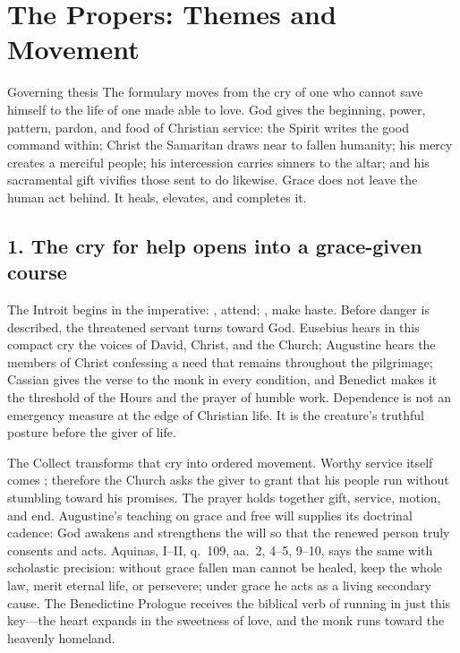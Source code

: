 \section*{The Propers: Themes and Movement}
\label{triptych:brief-synthesis:start}
\begingroup\fontsize{9}{9.8}\selectfont

\begin{studybox}{Governing thesis}
The formulary moves from the cry of one who cannot save himself to the life of
one made able to love. God gives the beginning, power, pattern, pardon, and
food of Christian service: the Spirit writes the good command within; Christ
the Samaritan draws near to fallen humanity; his mercy creates a merciful
people; his intercession carries sinners to the altar; and his sacramental
gift vivifies those sent to do likewise. Grace does not leave the human act
behind. It heals, elevates, and completes it.
\end{studybox}

\subsection*{1. The cry for help opens into a grace-given course }

The Introit begins in the imperative: , attend; ,
make haste. Before danger is described, the threatened servant turns toward
God. Eusebius hears in this compact cry the voices of David, Christ, and the
Church; Augustine hears the members of Christ confessing a need that remains
throughout the pilgrimage; Cassian gives the verse to the monk in every
condition, and Benedict makes it the threshold of the Hours and the prayer of
humble work. Dependence is not an emergency measure at the edge of Christian
life. It is the creature's truthful posture before the giver of life.

The Collect transforms that cry into ordered movement. Worthy service itself
comes ; therefore the Church asks the giver to grant
that his people run without stumbling toward his promises. The prayer holds
together gift, service, motion, and end. Augustine's teaching on grace and free
will supplies its doctrinal cadence: God awakens and strengthens the will so
that the renewed person truly consents and acts. Aquinas,  I--II,
q.~109, aa.~2, 4--5, 9--10, says the same with scholastic precision: without
grace fallen man cannot be healed, keep the whole law, merit eternal life, or
persevere; under grace he acts as a living secondary cause. The Benedictine Prologue receives the biblical verb of
running in just this key---the heart expands in the sweetness of love, and the
monk runs toward the heavenly homeland.

